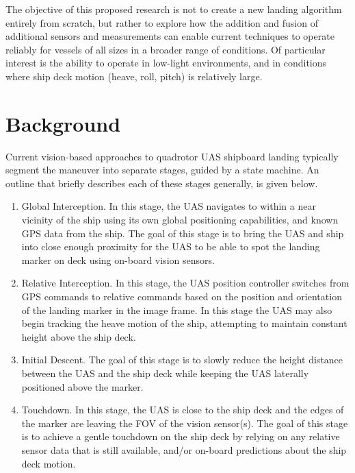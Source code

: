 \documentclass[12pt, letterpaper]{article}
\begin{document}

The objective of this proposed research is not to create a new landing algorithm entirely from scratch, but rather to explore how the addition and fusion of additional sensors and measurements can enable current techniques to operate reliably for vessels of all sizes in a broader range of conditions.  Of particular interest is the ability to operate in low-light environments, and in conditions where ship deck motion (heave, roll, pitch) is relatively large.


\section{Background}


Current vision-based approaches to quadrotor UAS shipboard landing typically segment the maneuver into separate stages, guided by a state machine.  An outline that briefly describes each of these stages generally, is given below.   

\begin{enumerate}
\item Global Interception.  In this stage, the UAS navigates to within a near vicinity of the ship using its own global positioning capabilities, and known GPS data from the ship.  The goal of this stage is to bring the UAS and ship into close enough proximity for the UAS to be able to spot the landing marker on deck using on-board vision sensors.
\item Relative Interception.  In this stage, the UAS position controller switches from GPS commands to relative commands based on the position and orientation of the landing marker in the image frame.  In this stage the UAS may also begin tracking the heave motion of the ship, attempting to maintain constant height above the ship deck.
\item Initial Descent.  The goal of this stage is to slowly reduce the height distance between the UAS and the ship deck while keeping the UAS laterally positioned above the marker.
\item Touchdown. In this stage, the UAS is close to the ship deck and the edges of the marker are leaving the FOV of the vision sensor(s).  The goal of this stage is to achieve a gentle touchdown on the ship deck by relying on any relative sensor data that is still available, and/or on-board predictions about the ship deck motion.
\end{enumerate}
\end{document}
